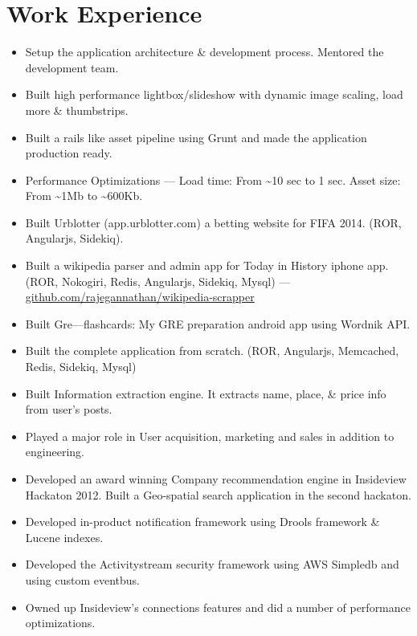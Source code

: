 \documentclass{cv}
\begin{document}
\section{Work Experience}
\begin{itemize} \itemsep1pt \parskip0pt
  \item Setup the application architecture \& development process. Mentored the development team.
  \item Built high performance lightbox/slideshow with dynamic image scaling, load more \& thumbstrips.
  \item Built a rails like asset pipeline using Grunt and made the application production ready.
  \item Performance Optimizations --- Load time: From \textasciitilde10 sec to 1 sec.  Asset size: From \textasciitilde1Mb to \textasciitilde600Kb.
\end{itemize}
\begin{itemize} \itemsep1pt \parskip0pt
  \item Built Urblotter (app.urblotter.com) a betting website for FIFA 2014. (ROR, Angularjs, Sidekiq).
  \item Built a wikipedia parser and admin app for Today in History iphone app. (ROR, Nokogiri, Redis, Angularjs, Sidekiq, Mysql) --- \url{github.com/rajegannathan/wikipedia-scrapper}
  \item Built Gre---flashcards: My GRE preparation android app using Wordnik API\@.
\end{itemize}
\begin{itemize} \itemsep1pt \parskip0pt
  \item Built the complete application from scratch. (ROR, Angularjs, Memcached, Redis, Sidekiq, Mysql)
  \item Built Information extraction engine. It extracts name, place, \& price info from user's posts.
  \item Played a major role in User acquisition, marketing and sales in addition to engineering. 
\end{itemize}
\begin{itemize} \itemsep1pt \parskip0pt
  \item Developed an award winning Company recommendation engine in Insideview Hackaton 2012.  Built a Geo-spatial search application in the second hackaton.
  \item Developed in-product notification framework using Drools framework \& Lucene indexes.
  \item Developed the Activitystream security framework using AWS Simpledb and using custom eventbus.
  \item Owned up Insideview's connections features and did a number of performance optimizations.
\end{itemize}
\end{document}
